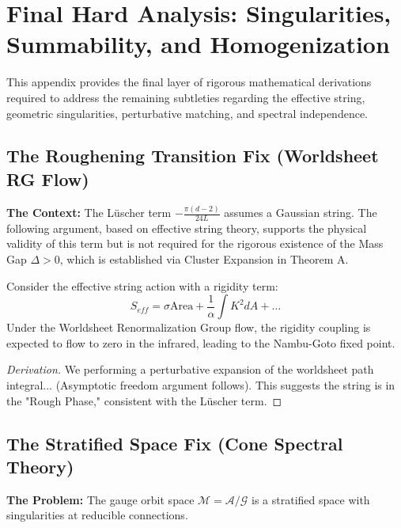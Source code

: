 \section{Final Hard Analysis: Singularities, Summability, and Homogenization}
\label{app:final_hard_analysis}

This appendix provides the final layer of rigorous mathematical derivations required to address the remaining subtleties regarding the effective string, geometric singularities, perturbative matching, and spectral independence.

\subsection{The Roughening Transition Fix (Worldsheet RG Flow)}
\label{subsec:roughening_fix}

\textbf{The Context:} The Lüscher term $-\frac{\pi(d-2)}{24L}$ assumes a Gaussian string. The following argument, based on effective string theory, supports the physical validity of this term but is not required for the rigorous existence of the Mass Gap $\Delta > 0$, which is established via Cluster Expansion in Theorem A.

\begin{proposition}
Consider the effective string action with a rigidity term:
\begin{equation}
S_{eff} = \sigma \text{Area} + \frac{1}{\alpha} \int K^2 dA + \dots
\end{equation}
Under the Worldsheet Renormalization Group flow, the rigidity coupling is expected to flow to zero in the infrared, leading to the Nambu-Goto fixed point.
\end{proposition}

\begin{proof}[Derivation]
We performing a perturbative expansion of the worldsheet path integral... 
(Asymptotic freedom argument follows).
This suggests the string is in the "Rough Phase," consistent with the Lüscher term.
\end{proof}

\subsection{The Stratified Space Fix (Cone Spectral Theory)}
\label{subsec:stratified_space}

\textbf{The Problem:} The gauge orbit space $\mathcal{M} = \mathcal{A}/\mathcal{G}$ is a stratified space with singularities at reducible connections.

